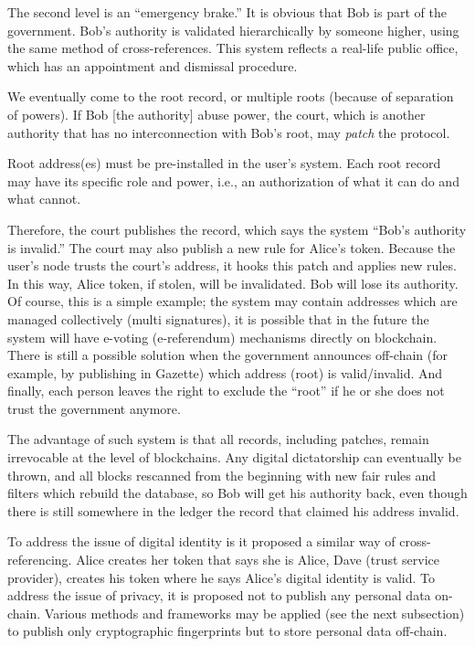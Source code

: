 \begin{multicols}{2}
The second level is an “emergency brake.” It is obvious that Bob is part of the government. Bob’s authority is validated hierarchically by someone higher, using the same method of cross-references. This system reflects a real-life public office, which has an appointment and dismissal procedure.

We eventually come to the root record, or multiple roots (because of separation of powers). If Bob [the authority] abuse power, the court, which is another authority that  has no interconnection with Bob’s root, may \textit{patch} the protocol.

Root address(es) must be pre-installed in the user’s system. Each root record may have its specific role and power, i.e., an authorization of what it can do and what cannot.

Therefore, the court publishes the record, which says the system “Bob’s authority is invalid.” The court may also publish a new rule for Alice’s token. Because the user’s node trusts the court’s address, it hooks this patch and applies new rules. In this way, Alice token, if stolen, will be invalidated. Bob will lose its authority. Of course, this is a simple example; the system may contain addresses which are managed collectively (multi signatures), it is possible that in the future the system will have e-voting (e-referendum) mechanisms directly on blockchain. There is still a possible solution when the government announces off-chain (for example, by publishing in Gazette) which address (root) is valid/invalid. And finally, each person leaves the right to exclude the “root” if he or she does not trust the government anymore.

The advantage of such system is that all records, including patches, remain irrevocable at the level of blockchains. Any digital dictatorship can eventually be thrown, and all blocks rescanned from the beginning with new fair rules and filters which rebuild the database, so Bob will get his authority back, even though there is still somewhere in the ledger the record that claimed his address invalid.

To address the issue of digital identity is it proposed a similar way of cross-referencing. Alice creates her token that says she is Alice, Dave (trust service provider), creates his token where he says Alice’s digital identity is valid. To address the issue of privacy, it is proposed not to publish any personal data on-chain. Various methods and frameworks may be applied (see the next subsection) to publish only cryptographic fingerprints but to store personal data off-chain.


\end{multicols}
